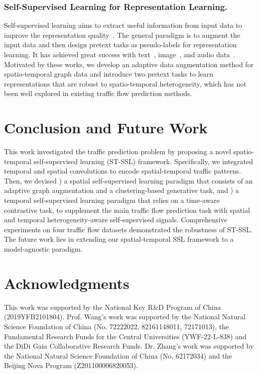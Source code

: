 \documentclass[letterpaper]{article} \usepackage{aaai23}  \usepackage{times}  \usepackage{helvet}  \usepackage{courier}  \usepackage[hyphens]{url}  \usepackage{graphicx} \urlstyle{rm} \def\UrlFont{\rm}  \usepackage{natbib}  \usepackage{caption} \frenchspacing  \setlength{\pdfpagewidth}{8.5in} \setlength{\pdfpageheight}{11in}
\newcommand{\name}{ST-SSL\xspace}
\begin{document}
\subsubsection{Self-Supervised Learning for Representation Learning.} Self-supervised learning aims to extract useful information from input data to improve the representation quality~\cite{hendrycks2019using}. The general paradigm is to augment the input data and then design pretext tasks as pseudo-labels for representation learning. It has achieved great success with text~\cite{kenton2019bert}, image~\cite{chen2020simple}, and audio data~\cite{oord2018representation}. Motivated by these works, we develop an adaptive data augmentation method for spatio-temporal graph data and introduce two pretext tasks to learn representations that are robust to spatio-temporal heterogeneity, which has not been well explored in existing traffic flow prediction methods.


\section{Conclusion and Future Work}

This work investigated the traffic prediction problem by proposing a novel spatio-temporal self-supervised learning (\name) framework. Specifically, we integrated temporal and spatial convolutions to encode spatial-temporal traffic patterns. Then, we devised ) a spatial self-supervised learning paradigm that consists of an adaptive graph augmentation and a clustering-based generative task, and ) a temporal self-supervised learning paradigm that relies on a time-aware contrastive task, to supplement the main traffic flow prediction task with spatial and temporal heterogeneity-aware self-supervised signals. Comprehensive experiments on four traffic flow datasets demonstrated the robustness of \name. The future work lies in extending our spatial-temporal SSL framework to a model-agnostic paradigm.





\clearpage

\section*{Acknowledgments}

This work was supported by the National Key R\&D Program of China (2019YFB2101804). Prof. Wang’s work was supported by the National Natural Science Foundation of China (No. 72222022, 82161148011, 72171013), the Fundamental Research Funds for the Central Universities (YWF-22-L-838) and the DiDi Gaia Collaborative Research Funds. Dr. Zhang’s work was supported by the National Natural Science Foundation of China (No. 62172034) and the Beijing Nova Program (Z201100006820053).


\end{document}
